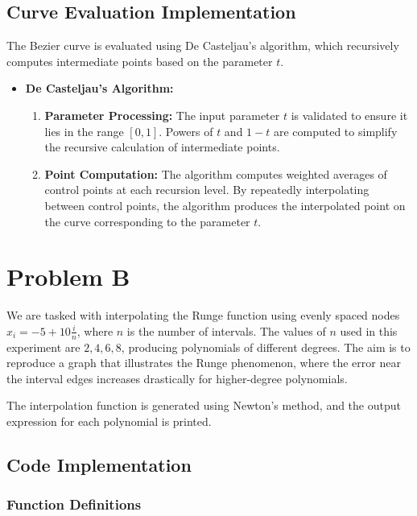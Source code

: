 \documentclass{article}
\begin{document}
\subsection{Curve Evaluation Implementation}
The Bezier curve is evaluated using De Casteljau's algorithm, which recursively computes intermediate points based on the parameter \(t\).

\begin{itemize}
    \item \textbf{De Casteljau's Algorithm:}
    \begin{enumerate}
        \item \textbf{Parameter Processing:} The input parameter \(t\) is validated to ensure it lies in the range \([0, 1]\). Powers of \(t\) and \(1 - t\) are computed to simplify the recursive calculation of intermediate points.
        
        \item \textbf{Point Computation:} The algorithm computes weighted averages of control points at each recursion level. By repeatedly interpolating between control points, the algorithm produces the interpolated point on the curve corresponding to the parameter \(t\).
    \end{enumerate}
\end{itemize}


\section{Problem B}

We are tasked with interpolating the Runge function using evenly spaced nodes $x_i = -5 + 10 \frac{i}{n}$, where $n$ is the number of intervals. The values of $n$ used in this experiment are $2, 4, 6, 8$, producing polynomials of different degrees. The aim is to reproduce a graph that illustrates the Runge phenomenon, where the error near the interval edges increases drastically for higher-degree polynomials.

The interpolation function is generated using Newton's method, and the output expression for each polynomial is printed.

\subsection{Code Implementation}

\subsubsection{Function Definitions}
\end{document}
